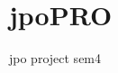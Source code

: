 \chapter{jpo\+PRO}
\hypertarget{md__r_e_a_d_m_e}{}\label{md__r_e_a_d_m_e}
\label{md__r_e_a_d_m_e_autotoc_md0}%
%


jpo project sem4 